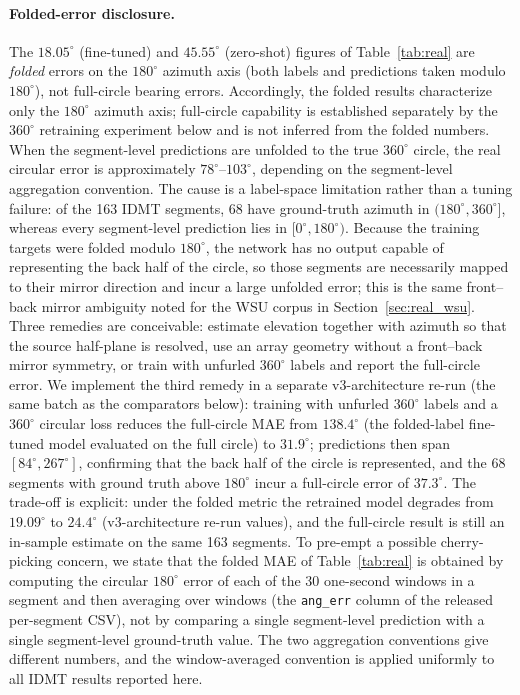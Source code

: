 \documentclass[5p,twocolumn]{elsarticle}
\begin{document}
\paragraph{Folded-error disclosure.}
The $18.05^\circ$ (fine-tuned) and $45.55^\circ$ (zero-shot) figures of Table~\ref{tab:real} are \emph{folded} errors on the $180^\circ$ azimuth axis (both labels and predictions taken modulo $180^\circ$), not full-circle bearing errors. Accordingly, the folded results characterize only the $180^\circ$ azimuth axis; full-circle capability is established separately by the $360^\circ$ retraining experiment below and is not inferred from the folded numbers. When the segment-level predictions are unfolded to the true $360^\circ$ circle, the real circular error is approximately $78^\circ$--$103^\circ$, depending on the segment-level aggregation convention. The cause is a label-space limitation rather than a tuning failure: of the 163 IDMT segments, 68 have ground-truth azimuth in $(180^\circ,360^\circ]$, whereas every segment-level prediction lies in $[0^\circ,180^\circ)$. Because the training targets were folded modulo $180^\circ$, the network has no output capable of representing the back half of the circle, so those segments are necessarily mapped to their mirror direction and incur a large unfolded error; this is the same front--back mirror ambiguity noted for the WSU corpus in Section~\ref{sec:real_wsu}. Three remedies are conceivable: estimate elevation together with azimuth so that the source half-plane is resolved, use an array geometry without a front--back mirror symmetry, or train with unfurled $360^\circ$ labels and report the full-circle error. We implement the third remedy in a separate v3-architecture re-run (the same batch as the comparators below): training with unfurled $360^\circ$ labels and a $360^\circ$ circular loss reduces the full-circle MAE from $138.4^\circ$ (the folded-label fine-tuned model evaluated on the full circle) to $31.9^\circ$; predictions then span $[84^\circ,267^\circ]$, confirming that the back half of the circle is represented, and the 68 segments with ground truth above $180^\circ$ incur a full-circle error of $37.3^\circ$. The trade-off is explicit: under the folded metric the retrained model degrades from $19.09^\circ$ to $24.4^\circ$ (v3-architecture re-run values), and the full-circle result is still an in-sample estimate on the same 163 segments. To pre-empt a possible cherry-picking concern, we state that the folded MAE of Table~\ref{tab:real} is obtained by computing the circular $180^\circ$ error of each of the 30 one-second windows in a segment and then averaging over windows (the \texttt{ang\_err} column of the released per-segment CSV), not by comparing a single segment-level prediction with a single segment-level ground-truth value. The two aggregation conventions give different numbers, and the window-averaged convention is applied uniformly to all IDMT results reported here.
\end{document}
